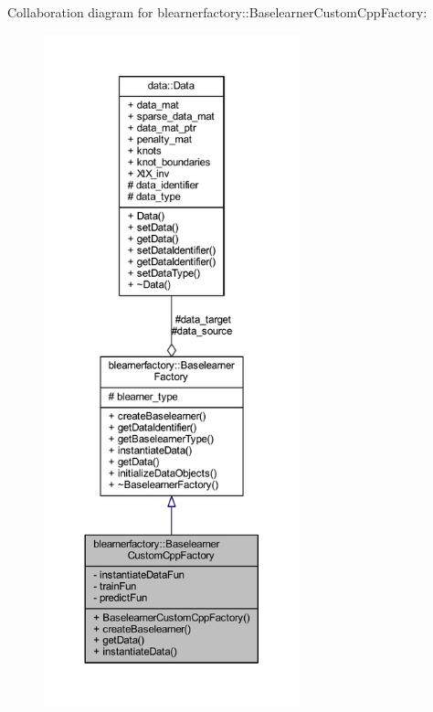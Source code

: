 Collaboration diagram for blearnerfactory\+:\+:Baselearner\+Custom\+Cpp\+Factory\+:
\nopagebreak
\begin{figure}[H]
\begin{center}
\leavevmode
\includegraphics[height=550pt]{classblearnerfactory_1_1_baselearner_custom_cpp_factory__coll__graph}
\end{center}
\end{figure}
